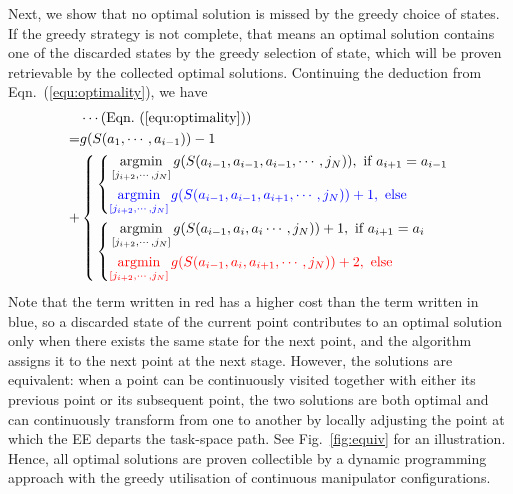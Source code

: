 \documentclass[letterpaper, 10 pt, journal, twoside]{ieeetran}  %
\begin{document}
Next, we show that no optimal solution is missed by the greedy choice of states. 
If the greedy strategy is not complete, that means an optimal solution contains one of the discarded states by the greedy selection of state, which will be 
proven retrievable by the collected optimal solutions. Continuing the deduction from Eqn.~(\ref{equ:optimality}), we have 
\begin{equation}
\begin{aligned}
&\cdots (\mbox{Eqn.}~(\ref{equ:optimality}))\\
=&g(S(a_1, \cdots, a_{i-1})) - 1 \\
+&\left\{
\begin{aligned}
	&\left\{
	\begin{aligned}
		&\mathop{\rm argmin}\limits_{[j_{i+2}, \cdots, j_N]} g(S(a_{i-1}, a_{i-1}, a_{i-1}, \cdots, j_N)), \mbox{ if } a_{i+1}=a_{i-1}\\
		&{\color{blue}\mathop{\rm argmin}\limits_{[j_{i+2}, \cdots, j_N]} g(S(a_{i-1}, a_{i-1}, a_{i+1}, \cdots, j_N))+1, \mbox{ else }}
	\end{aligned}
	\right.\\
  &\left\{
	\begin{aligned}
		&\mathop{\rm argmin}\limits_{[j_{i+2}, \cdots, j_N]} g(S(a_{i-1}, a_i, a_i\cdots, j_N))+1, \mbox{ if }a_{i+1}= a_i\\
		&{\color{red}\mathop{\rm argmin}\limits_{[j_{i+2}, \cdots, j_N]} g(S(a_{i-1}, a_i, a_{i+1}, \cdots, j_N))+2, \mbox{ else }}
	\end{aligned}
	\right.
\end{aligned}
\right.
\end{aligned}
\end{equation}
Note that the term written in red has a higher cost than the term written in blue, so a discarded state of the current point contributes to an optimal solution only when there exists the same state for the next point, and the algorithm assigns it to the next point at the next stage. 
However, the solutions are equivalent: when a point can be continuously visited together with either its previous point or its subsequent point, the two solutions are both optimal and can continuously transform from one to another by locally adjusting the point at which the EE departs the task-space path.
See Fig.~\ref{fig:equiv} for an illustration. 
Hence, all optimal solutions are proven collectible by a dynamic programming approach with the greedy utilisation of continuous manipulator configurations. 
\end{document}
